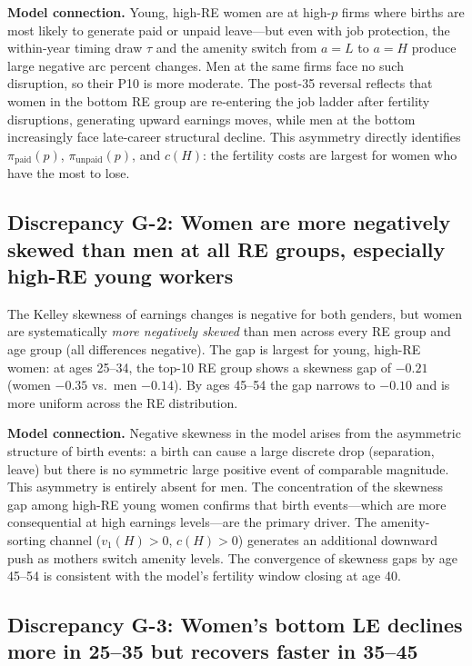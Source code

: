 \documentclass[11pt]{article}
\begin{document}
\medskip\noindent\textbf{Model connection.} Young, high-RE women are at high-$p$ firms where births are most likely to generate paid or unpaid leave---but even with job protection, the within-year timing draw $\tau$ and the amenity switch from $a=L$ to $a=H$ produce large negative arc percent changes. Men at the same firms face no such disruption, so their P10 is more moderate. The post-35 reversal reflects that women in the bottom RE group are re-entering the job ladder after fertility disruptions, generating upward earnings moves, while men at the bottom increasingly face late-career structural decline. This asymmetry directly identifies $\pi_{\text{paid}}(p)$, $\pi_{\text{unpaid}}(p)$, and $c(H)$: the fertility costs are largest for women who have the most to lose.

\subsection{Discrepancy G-2: Women are more negatively skewed than men at all RE groups, especially high-RE young workers}

The Kelley skewness of earnings changes is negative for both genders, but women are systematically \emph{more negatively skewed} than men across every RE group and age group (all differences negative). The gap is largest for young, high-RE women: at ages 25--34, the top-10 RE group shows a skewness gap of $-0.21$ (women $-0.35$ vs.\ men $-0.14$). By ages 45--54 the gap narrows to $-0.10$ and is more uniform across the RE distribution.

\medskip\noindent\textbf{Model connection.} Negative skewness in the model arises from the asymmetric structure of birth events: a birth can cause a large discrete drop (separation, leave) but there is no symmetric large positive event of comparable magnitude. This asymmetry is entirely absent for men. The concentration of the skewness gap among high-RE young women confirms that birth events---which are more consequential at high earnings levels---are the primary driver. The amenity-sorting channel ($v_1(H) > 0$, $c(H) > 0$) generates an additional downward push as mothers switch amenity levels. The convergence of skewness gaps by age 45--54 is consistent with the model's fertility window closing at age 40.

\subsection{Discrepancy G-3: Women's bottom LE declines more in 25--35 but recovers faster in 35--45}
\end{document}
